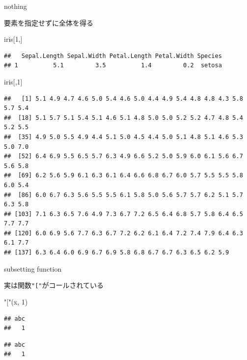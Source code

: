 \documentclass[ignorenonframetext,]{beamer}
\newenvironment{Shaded}{\begin{snugshade}}{\end{snugshade}}
\newcommand{\DecValTok}[1]{\textcolor[rgb]{0.00,0.00,0.81}{#1}}
\newcommand{\StringTok}[1]{\textcolor[rgb]{0.31,0.60,0.02}{#1}}
\newcommand{\OperatorTok}[1]{\textcolor[rgb]{0.81,0.36,0.00}{\textbf{#1}}}
\newcommand{\NormalTok}[1]{#1}
\begin{document}
\begin{frame}[fragile]{nothing}

要素を指定せずに全体を得る

\begin{Shaded}
\begin{Highlighting}[]
\NormalTok{iris[}\DecValTok{1}\NormalTok{,]}
\end{Highlighting}
\end{Shaded}

\begin{verbatim}
##   Sepal.Length Sepal.Width Petal.Length Petal.Width Species
## 1          5.1         3.5          1.4         0.2  setosa
\end{verbatim}

\begin{Shaded}
\begin{Highlighting}[]
\NormalTok{iris[,}\DecValTok{1}\NormalTok{]}
\end{Highlighting}
\end{Shaded}

\begin{verbatim}
##   [1] 5.1 4.9 4.7 4.6 5.0 5.4 4.6 5.0 4.4 4.9 5.4 4.8 4.8 4.3 5.8 5.7 5.4
##  [18] 5.1 5.7 5.1 5.4 5.1 4.6 5.1 4.8 5.0 5.0 5.2 5.2 4.7 4.8 5.4 5.2 5.5
##  [35] 4.9 5.0 5.5 4.9 4.4 5.1 5.0 4.5 4.4 5.0 5.1 4.8 5.1 4.6 5.3 5.0 7.0
##  [52] 6.4 6.9 5.5 6.5 5.7 6.3 4.9 6.6 5.2 5.0 5.9 6.0 6.1 5.6 6.7 5.6 5.8
##  [69] 6.2 5.6 5.9 6.1 6.3 6.1 6.4 6.6 6.8 6.7 6.0 5.7 5.5 5.5 5.8 6.0 5.4
##  [86] 6.0 6.7 6.3 5.6 5.5 5.5 6.1 5.8 5.0 5.6 5.7 5.7 6.2 5.1 5.7 6.3 5.8
## [103] 7.1 6.3 6.5 7.6 4.9 7.3 6.7 7.2 6.5 6.4 6.8 5.7 5.8 6.4 6.5 7.7 7.7
## [120] 6.0 6.9 5.6 7.7 6.3 6.7 7.2 6.2 6.1 6.4 7.2 7.4 7.9 6.4 6.3 6.1 7.7
## [137] 6.3 6.4 6.0 6.9 6.7 6.9 5.8 6.8 6.7 6.7 6.3 6.5 6.2 5.9
\end{verbatim}

\end{frame}

\begin{frame}[fragile]{subsetting function}

実は関数\texttt{"{[}"}がコールされている

\begin{Shaded}
\begin{Highlighting}[]
\StringTok{"["}\NormalTok{(x, }\DecValTok{1}\NormalTok{)}
\end{Highlighting}
\end{Shaded}

\begin{verbatim}
## abc 
##   1
\end{verbatim}

\begin{Shaded}
\begin{Highlighting}[]
\NormalTok{x }\OperatorTok{%
\end{Highlighting}
\end{Shaded}

\begin{verbatim}
## abc 
##   1
\end{verbatim}

\end{frame}
\end{document}
